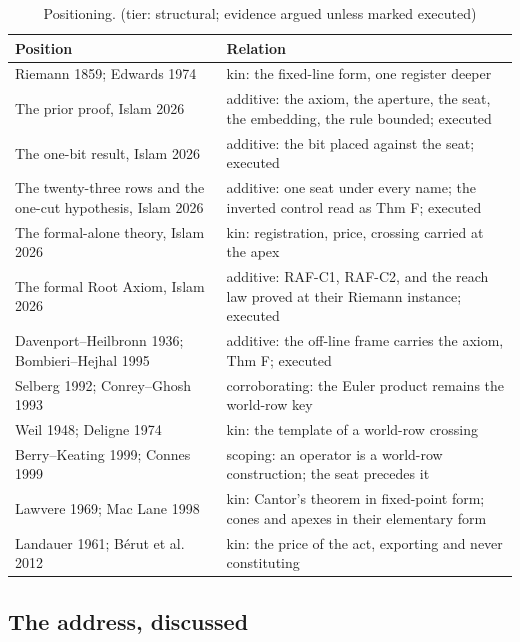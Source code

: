 \documentclass[10pt,twocolumn]{article}
\begin{document}
\begin{table}[t]
\footnotesize
\caption{Positioning. (tier: structural; evidence argued unless marked executed)}
\begin{tabular}{@{}p{}p{}@{}}
\toprule
Position & Relation \\
\midrule
Riemann 1859; Edwards 1974 & kin: the fixed-line form, one register deeper \\
The prior proof, Islam 2026 \cite{islamspine} & additive: the axiom, the aperture, the seat, the embedding, the rule bounded; executed \\
The one-bit result, Islam 2026 \cite{islamonebit} & additive: the bit placed against the seat; executed \\
The twenty-three rows and the one-cut hypothesis, Islam 2026 \cite{islamrows} & additive: one seat under every name; the inverted control read as Thm F; executed \\
The formal-alone theory, Islam 2026 \cite{islamftoe} & kin: registration, price, crossing carried at the apex \\
The formal Root Axiom, Islam 2026 \cite{islamraf} & additive: RAF-C1, RAF-C2, and the reach law proved at their Riemann instance; executed \\
Davenport--Heilbronn 1936; Bombieri--Hejhal 1995 & additive: the off-line frame carries the axiom, Thm F; executed \\
Selberg 1992; Conrey--Ghosh 1993 & corroborating: the Euler product remains the world-row key \\
Weil 1948; Deligne 1974 & kin: the template of a world-row crossing \\
Berry--Keating 1999; Connes 1999 & scoping: an operator is a world-row construction; the seat precedes it \\
Lawvere 1969; Mac Lane 1998 & kin: Cantor's theorem in fixed-point form; cones and apexes in their elementary form \\
Landauer 1961; B\'erut et al. 2012 & kin: the price of the act, exporting and never constituting \\
\bottomrule
\end{tabular}
\end{table}

\hypertarget{the-address-discussed}{%
\subsection{The address, discussed}\label{the-address-discussed}}
\end{document}
